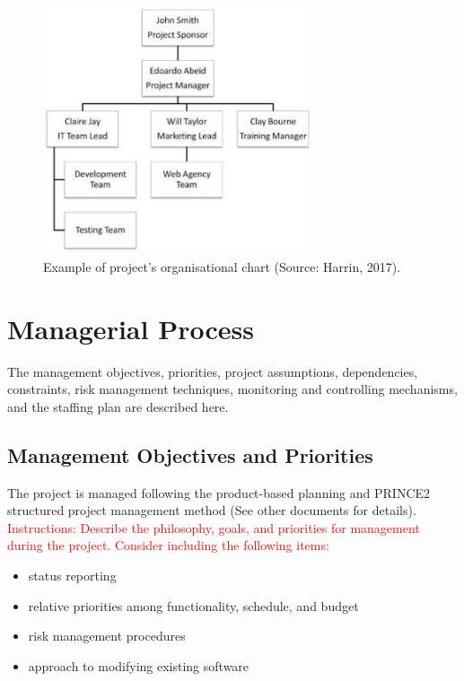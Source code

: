 \documentclass{article}
\begin{document}
\begin{figure}[h]
  \centering
  \includegraphics[width=0.7\textwidth]{harrin_2017.png}
  \caption{ Example of project's organisational chart (Source: Harrin, 2017).}
  \label{harrin}
\end{figure}




\section{Managerial Process}
The management objectives, priorities, project assumptions, dependencies, constraints, risk management techniques, monitoring and controlling mechanisms, and the staffing plan are described here.




\subsection{Management Objectives and Priorities}
The project is managed following the product-based planning and PRINCE2
structured project management method (See other documents for details).
\textcolor{red}{Instructions: Describe the philosophy, goals, and priorities for management
during the project. Consider including the following items:}

\begin{itemize}
\item {\color{red}status reporting}
\item {\color{red}relative priorities among functionality, schedule, and budget}
\item {\color{red}risk management procedures}
\item {\color{red}approach to modifying existing software}
\end{itemize}
\end{document}
